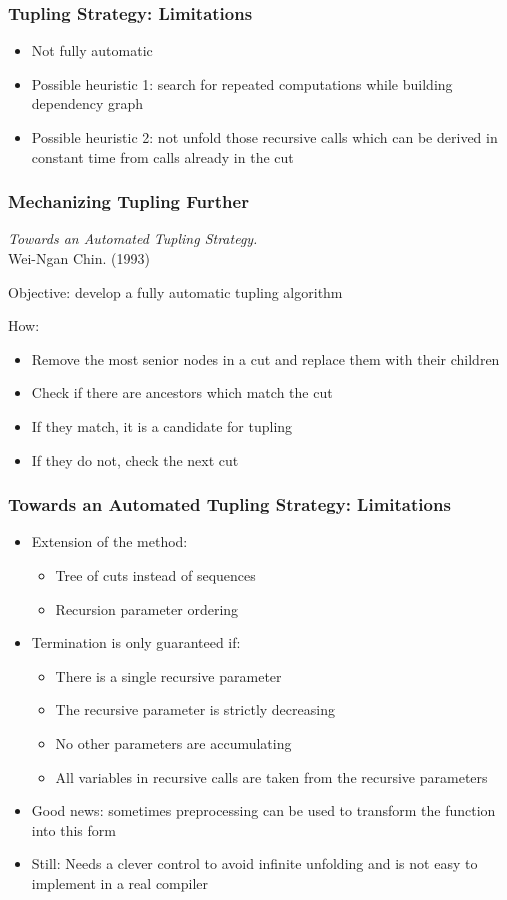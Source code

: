 \documentclass{beamer}
\begin{document}
\begin{frame}[fragile]
  \frametitle{Tupling Strategy: Limitations}
\begin{itemize}
  \item Not fully automatic
  \item Possible heuristic 1: search for repeated computations while building dependency graph
  \item Possible heuristic 2: not unfold those recursive calls which can be derived in constant time from calls already in the cut
\end{itemize}
\end{frame}

\begin{frame}[t]
  \frametitle{Mechanizing Tupling Further}
\textit{Towards an Automated Tupling Strategy.} \\Wei-Ngan Chin. (1993)

\vspace{0.6cm}

Objective: develop a fully automatic tupling algorithm

\vspace{0.6cm}

How:
\begin{itemize}
  \item Remove the most senior nodes in a cut and replace them with their children
  \item Check if there are ancestors which match the cut
  \item If they match, it is a candidate for tupling
  \item If they do not, check the next cut
\end{itemize}
\end{frame}

\begin{frame}[fragile]
  \frametitle{Towards an Automated Tupling Strategy: Limitations}
\begin{itemize}
  \item Extension of the method:
  \begin{itemize}
    \item Tree of cuts instead of sequences
    \item Recursion parameter ordering
  \end{itemize}
  \item Termination is only guaranteed if:
  \begin{itemize}
    \item There is a single recursive parameter
    \item The recursive parameter is strictly decreasing
    \item No other parameters are accumulating
    \item All variables in recursive calls are taken from the recursive parameters
  \end{itemize}
  \item Good news: sometimes preprocessing can be used to transform the function into this form
  \item Still: Needs a clever control to avoid infinite unfolding and is not easy to implement in a real compiler
\end{itemize}
\end{frame}
\end{document}
